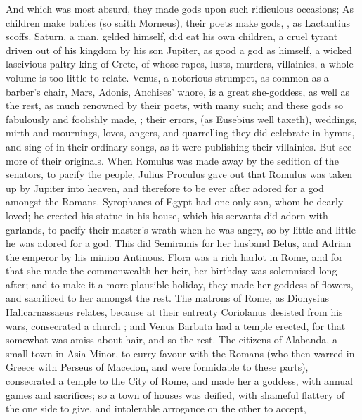 {And which was most absurd, they made gods upon such ridiculous
occasions; As children make babies (so saith Morneus), their
poets make gods, , as
Lactantius scoffs. Saturn, a man, gelded himself, did eat his own
children, a cruel tyrant driven out of his kingdom by his son Jupiter,
as good a god as himself, a wicked lascivious paltry king of Crete, of
whose rapes, lusts, murders, villainies, a whole volume is too little
to relate. Venus, a notorious strumpet, as common as a barber's chair,
Mars, Adonis, Anchises' whore, is a great she-goddess, as well as the
rest, as much renowned by their poets, with many such; and these gods
so fabulously and foolishly made, ; their errors,  (as Eusebius well taxeth), weddings,
mirth and mournings, loves, angers, and quarrelling they did celebrate
in hymns, and sing of in their ordinary songs, as it were publishing
their villainies. But see more of their originals. When Romulus was
made away by the sedition of the senators, to pacify the people,
Julius Proculus gave out that Romulus was taken up by Jupiter
into heaven, and therefore to be ever after adored for a god amongst
the Romans. Syrophanes of Egypt had one only son, whom he dearly loved;
he erected his statue in his house, which his servants did adorn with
garlands, to pacify their master's wrath when he was angry, so by
little and little he was adored for a god. This did Semiramis for her
husband Belus, and Adrian the emperor by his minion Antinous. Flora was
a rich harlot in Rome, and for that she made the commonwealth her heir,
her birthday was solemnised long after; and to make it a more plausible
holiday, they made her goddess of flowers, and sacrificed to her
amongst the rest. The matrons of Rome, as Dionysius Halicarnassaeus
relates, because at their entreaty Coriolanus desisted from his wars,
consecrated a church ; and Venus Barbata had a
temple erected, for that somewhat was amiss about hair, and so the
rest. The citizens of Alabanda, a small town in Asia Minor, to
curry favour with the Romans (who then warred in Greece with Perseus of
Macedon, and were formidable to these parts), consecrated a temple to
the City of Rome, and made her a goddess, with annual games and
sacrifices; so a town of houses was deified, with shameful flattery of
the one side to give, and intolerable arrogance on the other to accept,
}
